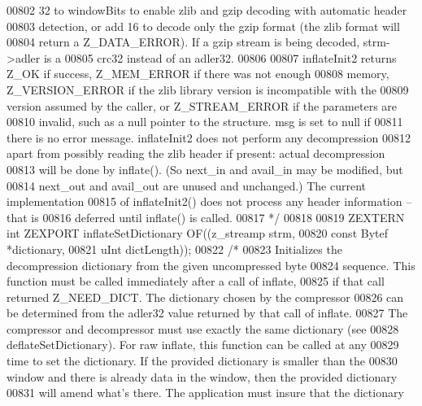 \begin{DoxyCode}
00802 \textcolor{comment}{   32 to windowBits to enable zlib and gzip decoding with automatic header}
00803 \textcolor{comment}{   detection, or add 16 to decode only the gzip format (the zlib format will}
00804 \textcolor{comment}{   return a Z\_DATA\_ERROR).  If a gzip stream is being decoded, strm->adler is a}
00805 \textcolor{comment}{   crc32 instead of an adler32.}
00806 \textcolor{comment}{}
00807 \textcolor{comment}{     inflateInit2 returns Z\_OK if success, Z\_MEM\_ERROR if there was not enough}
00808 \textcolor{comment}{   memory, Z\_VERSION\_ERROR if the zlib library version is incompatible with the}
00809 \textcolor{comment}{   version assumed by the caller, or Z\_STREAM\_ERROR if the parameters are}
00810 \textcolor{comment}{   invalid, such as a null pointer to the structure.  msg is set to null if}
00811 \textcolor{comment}{   there is no error message.  inflateInit2 does not perform any decompression}
00812 \textcolor{comment}{   apart from possibly reading the zlib header if present: actual decompression}
00813 \textcolor{comment}{   will be done by inflate().  (So next\_in and avail\_in may be modified, but}
00814 \textcolor{comment}{   next\_out and avail\_out are unused and unchanged.) The current implementation}
00815 \textcolor{comment}{   of inflateInit2() does not process any header information -- that is}
00816 \textcolor{comment}{   deferred until inflate() is called.}
00817 \textcolor{comment}{*/}
00818 
00819 ZEXTERN \textcolor{keywordtype}{int} ZEXPORT inflateSetDictionary OF((z\_streamp strm,
00820                                              \textcolor{keyword}{const} Bytef *dictionary,
00821                                              uInt  dictLength));
00822 \textcolor{comment}{/*}
00823 \textcolor{comment}{     Initializes the decompression dictionary from the given uncompressed byte}
00824 \textcolor{comment}{   sequence.  This function must be called immediately after a call of inflate,}
00825 \textcolor{comment}{   if that call returned Z\_NEED\_DICT.  The dictionary chosen by the compressor}
00826 \textcolor{comment}{   can be determined from the adler32 value returned by that call of inflate.}
00827 \textcolor{comment}{   The compressor and decompressor must use exactly the same dictionary (see}
00828 \textcolor{comment}{   deflateSetDictionary).  For raw inflate, this function can be called at any}
00829 \textcolor{comment}{   time to set the dictionary.  If the provided dictionary is smaller than the}
00830 \textcolor{comment}{   window and there is already data in the window, then the provided dictionary}
00831 \textcolor{comment}{   will amend what's there.  The application must insure that the dictionary}

\end{DoxyCode}
